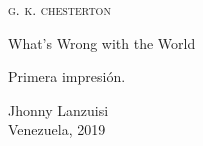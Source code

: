 \documentclass[letterpaper]{article}
\begin{document}
	\thispagestyle{empty}
\begin{center}
		\textsc{\LARGE g. k. chesterton}
\end{center}
\vfill
\begin{center}\huge
	What's Wrong with the World
\end{center}
\pagebreak
\thispagestyle{empty}
\large
Primera impresión.
\vfill
\begin{flushright}
	Jhonny Lanzuisi\\ Venezuela, 2019
\end{flushright}
\end{document}
